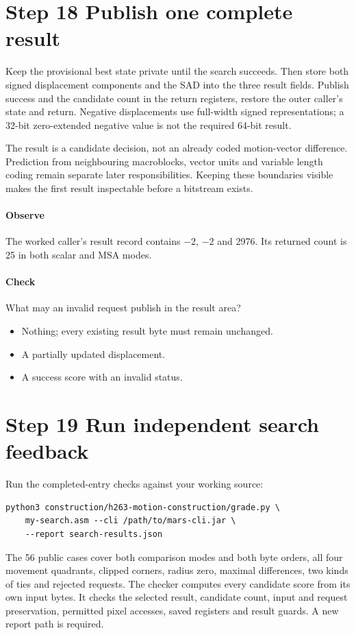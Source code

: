 \section{Step 18 Publish one complete result}\label{h263-motion-s08}
Keep the provisional best state private until the search succeeds. Then store
both signed displacement components and the SAD into the three result fields.
Publish success and the candidate count in the return registers, restore the
outer caller's state and return. Negative displacements use full-width signed
representations; a 32-bit zero-extended negative value is not the required
64-bit result.

The result is a candidate decision, not an already coded motion-vector
difference. Prediction from neighbouring macroblocks, vector units and variable
length coding remain separate later responsibilities. Keeping these boundaries
visible makes the first result inspectable before a bitstream exists.

\paragraph{Observe} The worked caller's result record contains $-2$, $-2$ and
2976. Its returned count is 25 in both scalar and MSA modes.
\paragraph{Check} What may an invalid request publish in the result area?
\begin{itemize}
  \item[A.] Nothing; every existing result byte must remain unchanged.
  \item[B.] A partially updated displacement.
  \item[C.] A success score with an invalid status.
\end{itemize}

\section{Step 19 Run independent search feedback}\label{h263-motion-s09}
Run the completed-entry checks against your working source:
\begin{verbatim}
python3 construction/h263-motion-construction/grade.py \
    my-search.asm --cli /path/to/mars-cli.jar \
    --report search-results.json
\end{verbatim}
The 56 public cases cover both comparison modes and both byte orders, all four
movement quadrants, clipped corners, radius zero, maximal differences, two kinds
of ties and rejected requests. The checker computes every candidate score from
its own input bytes. It checks the selected result, candidate count, input and
request preservation, permitted pixel accesses, saved registers and result guards.
A new report path is required.

